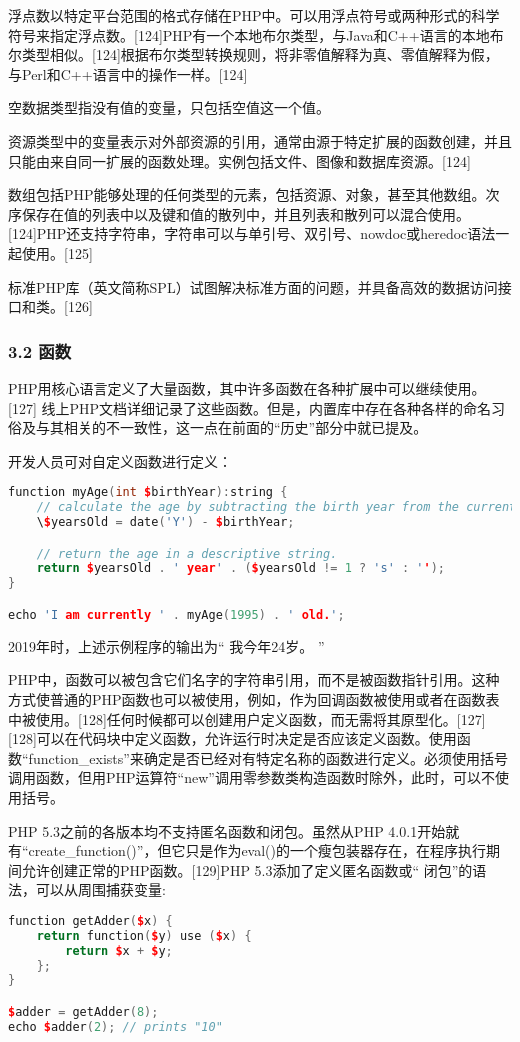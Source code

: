 浮点数以特定平台范围的格式存储在PHP中。可以用浮点符号或两种形式的科学符号来指定浮点数。[124]PHP有一个本地布尔类型，与Java和C++语言的本地布尔类型相似。[124]根据布尔类型转换规则，将非零值解释为真、零值解释为假，与Perl和C++语言中的操作一样。[124]

空数据类型指没有值的变量，只包括空值这一个值。

资源类型中的变量表示对外部资源的引用，通常由源于特定扩展的函数创建，并且只能由来自同一扩展的函数处理。实例包括文件、图像和数据库资源。[124]

数组包括PHP能够处理的任何类型的元素，包括资源、对象，甚至其他数组。次序保存在值的列表中以及键和值的散列中，并且列表和散列可以混合使用。[124]PHP还支持字符串，字符串可以与单引号、双引号、nowdoc或heredoc语法一起使用。[125]

标准PHP库（英文简称SPL）试图解决标准方面的问题，并具备高效的数据访问接口和类。[126]
\subsubsection{3.2 函数}
PHP用核心语言定义了大量函数，其中许多函数在各种扩展中可以继续使用。[127] 线上PHP文档详细记录了这些函数。但是，内置库中存在各种各样的命名习俗及与其相关的不一致性，这一点在前面的“历史”部分中就已提及。

开发人员可对自定义函数进行定义：
\begin{lstlisting}[language=cpp]
function myAge(int $birthYear):string {
    // calculate the age by subtracting the birth year from the current year.
    \$yearsOld = date('Y') - $birthYear;

    // return the age in a descriptive string.
    return $yearsOld . ' year' . ($yearsOld != 1 ? 's' : '');
}

echo 'I am currently ' . myAge(1995) . ' old.';
\end{lstlisting}
2019年时，上述示例程序的输出为“ 我今年24岁。 ”

PHP中，函数可以被包含它们名字的字符串引用，而不是被函数指针引用。这种方式使普通的PHP函数也可以被使用，例如，作为回调函数被使用或者在函数表中被使用。[128]任何时候都可以创建用户定义函数，而无需将其原型化。[127][128]可以在代码块中定义函数，允许运行时决定是否应该定义函数。使用函数“function_exists”来确定是否已经对有特定名称的函数进行定义。必须使用括号调用函数，但用PHP运算符“new”调用零参数类构造函数时除外，此时，可以不使用括号。

PHP 5.3之前的各版本均不支持匿名函数和闭包。虽然从PHP 4.0.1开始就有“create_function()”，但它只是作为eval()的一个瘦包装器存在，在程序执行期间允许创建正常的PHP函数。[129]PHP 5.3添加了定义匿名函数或“ 闭包”的语法，可以从周围捕获变量:
\begin{lstlisting}[language=cpp]
function getAdder($x) {
    return function($y) use ($x) {
        return $x + $y;
    };
}

$adder = getAdder(8);
echo $adder(2); // prints "10"
\end{lstlisting}


